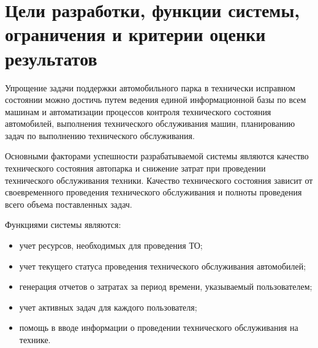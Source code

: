 \section{Цели разработки, функции системы, ограничения и критерии оценки
результатов}

Упрощение задачи поддержки автомобильного парка в технически исправном состоянии
можно достичь путем ведения единой информационной базы по всем машинам и
автоматизации процессов контроля технического состояния автомобилей, выполнения
технического обслуживания машин, планированию задач по выполнению технического
обслуживания.

Основными факторами успешности разрабатываемой системы являются качество
технического состояния автопарка и снижение затрат при проведении технического
обслуживания техники. Качество технического состояния зависит от своевременного
проведения технического обслуживания и полноты проведения всего объема
поставленных задач.

Функциями системы являются:
\begin{itemize}

	\item учет ресурсов, необходимых для проведения ТО;

    \item учет текущего статуса проведения технического обслуживания
        автомобилей;

    \item генерация отчетов о затратах за период времени, указываемый
        пользователем;

    \item учет активных задач для каждого пользователя;

    \item помощь в вводе информации о проведении технического обслуживания на
        технике.

\end{itemize}
